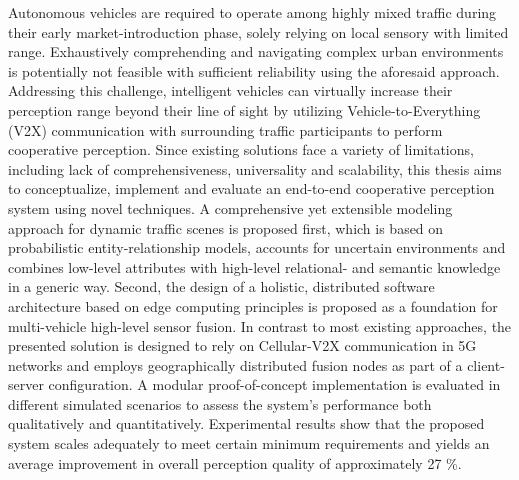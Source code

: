 Autonomous vehicles are required to operate among highly mixed traffic during their early market-introduction phase, solely relying on local sensory with limited range. Exhaustively comprehending and navigating complex urban environments is potentially not feasible with sufficient reliability using the aforesaid approach. Addressing this challenge, intelligent vehicles can virtually increase their perception range beyond their line of sight by utilizing Vehicle-to-Everything (V2X) communication with surrounding traffic participants to perform cooperative perception. Since existing solutions face a variety of limitations, including lack of comprehensiveness, universality and scalability, this thesis aims to conceptualize, implement and evaluate an end-to-end cooperative perception system using novel techniques. A comprehensive yet extensible modeling approach for dynamic traffic scenes is proposed first, which is based on probabilistic entity-relationship models, accounts for uncertain environments and combines low-level attributes with high-level relational- and semantic knowledge in a generic way. Second, the design of a holistic, distributed software architecture based on edge computing principles is proposed as a foundation for multi-vehicle high-level sensor fusion. In contrast to most existing approaches, the presented solution is designed to rely on Cellular-V2X communication in 5G networks and employs geographically distributed fusion nodes as part of a client-server configuration. A modular proof-of-concept implementation is evaluated in different simulated scenarios to assess the system's performance both qualitatively and quantitatively. Experimental results show that the proposed system scales adequately to meet certain minimum requirements and yields an average improvement in overall perception quality of approximately 27 \%.